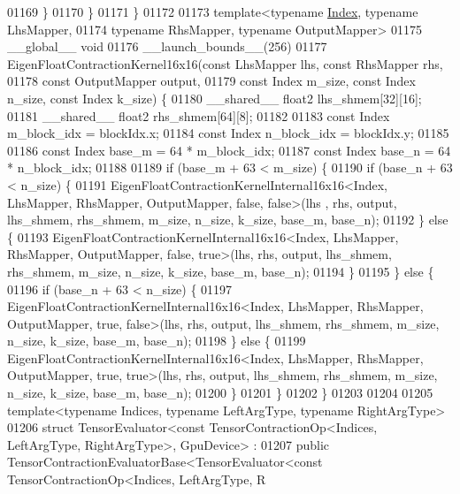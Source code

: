 \begin{DoxyCode}
01169     \}
01170   \}
01171 \}
01172 
01173 \textcolor{keyword}{template}<\textcolor{keyword}{typename} \hyperlink{namespace_eigen_a62e77e0933482dafde8fe197d9a2cfde}{Index}, \textcolor{keyword}{typename} LhsMapper,
01174          \textcolor{keyword}{typename} RhsMapper, \textcolor{keyword}{typename} OutputMapper>
01175 \_\_global\_\_ \textcolor{keywordtype}{void}
01176 \_\_launch\_bounds\_\_(256)
01177 EigenFloatContractionKernel16x16(const LhsMapper lhs, const RhsMapper rhs,
01178                        const OutputMapper output,
01179                        const Index m\_size, const Index n\_size, const Index k\_size) \{
01180   \_\_shared\_\_ float2 lhs\_shmem[32][16];
01181   \_\_shared\_\_ float2 rhs\_shmem[64][8];
01182 
01183   \textcolor{keyword}{const} Index m\_block\_idx = blockIdx.x;
01184   \textcolor{keyword}{const} Index n\_block\_idx = blockIdx.y;
01185 
01186   \textcolor{keyword}{const} Index base\_m = 64 * m\_block\_idx;
01187   \textcolor{keyword}{const} Index base\_n = 64 * n\_block\_idx;
01188 
01189   \textcolor{keywordflow}{if} (base\_m + 63 < m\_size) \{
01190     \textcolor{keywordflow}{if} (base\_n + 63 < n\_size) \{
01191       EigenFloatContractionKernelInternal16x16<Index, LhsMapper, RhsMapper, OutputMapper, false, false>(lhs
      , rhs, output, lhs\_shmem, rhs\_shmem, m\_size, n\_size, k\_size, base\_m, base\_n);
01192     \} \textcolor{keywordflow}{else} \{
01193       EigenFloatContractionKernelInternal16x16<Index, LhsMapper, RhsMapper, OutputMapper, false, true>(lhs,
       rhs, output, lhs\_shmem, rhs\_shmem, m\_size, n\_size, k\_size, base\_m, base\_n);
01194     \}
01195   \} \textcolor{keywordflow}{else} \{
01196     \textcolor{keywordflow}{if} (base\_n + 63 < n\_size) \{
01197       EigenFloatContractionKernelInternal16x16<Index, LhsMapper, RhsMapper, OutputMapper, true, false>(lhs,
       rhs, output, lhs\_shmem, rhs\_shmem, m\_size, n\_size, k\_size, base\_m, base\_n);
01198     \} \textcolor{keywordflow}{else} \{
01199       EigenFloatContractionKernelInternal16x16<Index, LhsMapper, RhsMapper, OutputMapper, true, true>(lhs, 
      rhs, output, lhs\_shmem, rhs\_shmem, m\_size, n\_size, k\_size, base\_m, base\_n);
01200     \}
01201   \}
01202 \}
01203 
01204 
01205 \textcolor{keyword}{template}<\textcolor{keyword}{typename} Indices, \textcolor{keyword}{typename} LeftArgType, \textcolor{keyword}{typename} RightArgType>
01206 \textcolor{keyword}{struct }TensorEvaluator<const TensorContractionOp<Indices, LeftArgType, RightArgType>, GpuDevice> :
01207     \textcolor{keyword}{public} TensorContractionEvaluatorBase<TensorEvaluator<const TensorContractionOp<Indices, LeftArgType, R

\end{DoxyCode}
